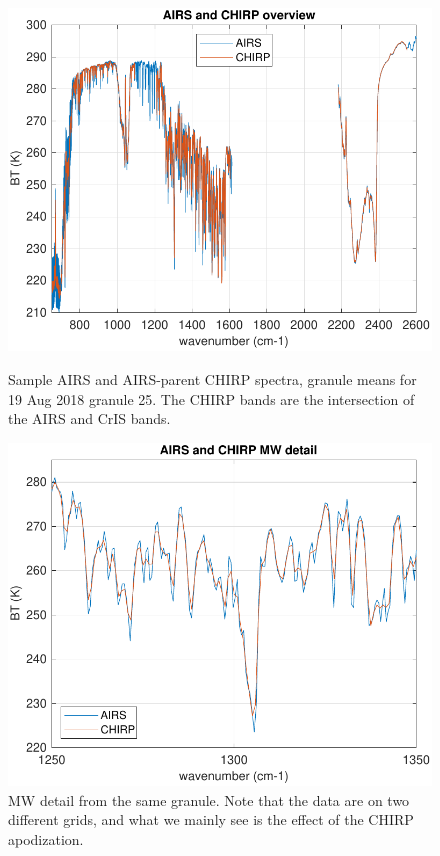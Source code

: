 \documentclass[12pt]{article}
\begin{document}
\begin{figure}
  \centering
  \begin{minipage}[t]{0.45\textwidth}
    \centering
    \includegraphics[width=\textwidth]{figures/airs_and_chirp_overview.pdf}
    \caption{Sample AIRS and AIRS-parent CHIRP spectra, granule means
      for 19 Aug 2018 granule 25.  The CHIRP bands are the intersection
      of the AIRS and CrIS bands.}
    \label{fig1}
  \end{minipage}\hfill
  \begin{minipage}[t]{0.45\textwidth}
    \centering
    \includegraphics[width=\textwidth]{figures/airs_and_chirp_mw_detail.pdf}
    \caption{MW detail from the same granule.  Note that the data
      are on two different grids, and what we mainly see is the
      effect of the CHIRP apodization.}
    \label{fig2}
  \end{minipage}
\end{figure}
\end{document}
